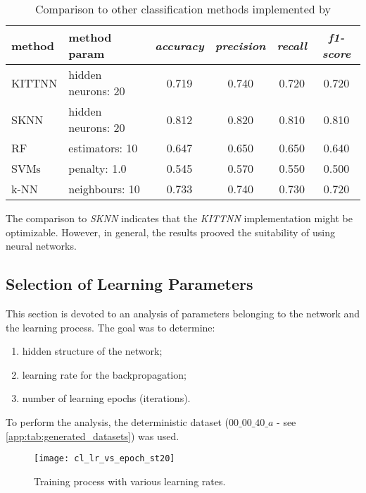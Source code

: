 \begin{table}[H]
\centering
\caption{Comparison to other classification methods implemented by \citep{article:scikit-learn}}
\label{tab:tc_comparison_to_other_classification_methods}
\begin{tabular}{|l|l|c|c|c|c|} 
\hline
method & method param & \textit{accuracy} & \textit{precision} & \textit{recall} & \textit{f1-score} \\
\hline \hline
   KITTNN 	&  hidden neurons: 20 	 &     0.719 &      0.740 &      0.720 &   0.720\\ \hline
   SKNN     &  hidden neurons: 20 	 &     0.812 &      0.820 &      0.810 &   0.810\\ \hline
   RF       &  estimators: 10		 &     0.647 &      0.650 &      0.650 &   0.640\\ \hline
   SVMs     &  penalty: 1.0			 &     0.545 &      0.570 &      0.550 &   0.500\\ \hline
   k-NN     &  neighbours: 10	 	 &     0.733 &      0.740 &      0.730 &   0.720\\ \hline
\hline
\end{tabular}
\end{table}

The comparison to \textit{SKNN} indicates that the \textit{KITTNN} implementation might be optimizable. However, in general, the results prooved the suitability of using neural networks.

\subsection{Selection of Learning Parameters} \label{ssec:selection_of_learning_parameters}
This section is devoted to an analysis of parameters belonging to the network and the learning process. The goal was to determine:

\begin{enumerate}
\item hidden structure of the network;
\item learning rate for the backpropagation;
\item number of learning epochs (iterations).
\end{enumerate}

To perform the analysis, the deterministic dataset ($ 00\_00\_40\_a $ - see \cref{app:tab:generated_datasets}) was used.

\begin{figure}[H]
  \centering
  \texttt{[image: cl\_lr\_vs\_epoch\_st20]}
  \caption{Training process with various learning rates.}
  \label{fig:lr_analysis}
\end{figure}

